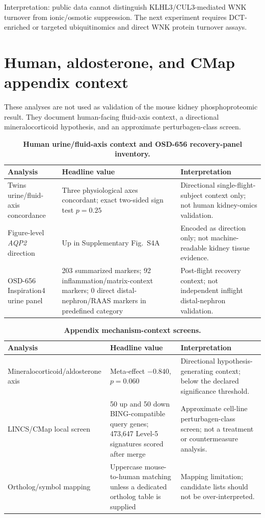 \documentclass[10pt]{article}
\newcommand{\gene}[1]{\textit{#1}}
\newcommand{\code}[1]{\texttt{\detokenize{#1}}}
\begin{document}
\noindent
Interpretation: public data cannot distinguish KLHL3/CUL3-mediated WNK turnover from ionic/osmotic suppression. The next experiment requires DCT-enriched or targeted ubiquitinomics and direct WNK protein turnover assays.

\section{Human, aldosterone, and CMap appendix context}

These analyses are not used as validation of the mouse kidney phosphoproteomic result. They document human-facing fluid-axis context, a directional mineralocorticoid hypothesis, and an approximate perturbagen-class screen.

\begin{table}[H]
\centering\small
\caption{\textbf{Human urine/fluid-axis context and OSD-656 recovery-panel inventory.}}
\label{tab:humancontext}
\begin{tabularx}{\textwidth}{p{}p{}X}
\toprule
Analysis & Headline value & Interpretation \\
\midrule
Twins urine/fluid-axis concordance & Three physiological axes concordant; exact two-sided sign test $p=0.25$ & Directional single-flight-subject context only; not human kidney-omics validation. \\
Figure-level \gene{AQP2} direction & Up in Supplementary Fig.~S4A & Encoded as direction only; not machine-readable kidney tissue evidence. \\
OSD-656 Inspiration4 urine panel & 203 summarized markers; 92 inflammation/matrix-context markers; 0 direct distal-nephron/RAAS markers in predefined category & Post-flight recovery context; not independent inflight distal-nephron validation. \\
\bottomrule
\end{tabularx}
\end{table}

\begin{table}[H]
\centering\small
\caption{\textbf{Appendix mechanism-context screens.}}
\label{tab:appendixmechanisms}
\begin{tabularx}{\textwidth}{p{}p{}X}
\toprule
Analysis & Headline value & Interpretation \\
\midrule
Mineralocorticoid/aldosterone axis & Meta-effect $-0.840$, $p=0.060$ & Directional hypothesis-generating context; below the declared significance threshold. \\
LINCS/CMap local screen & 50 up and 50 down BING-compatible query genes; 473,647 Level-5 signatures scored after \code{sig\_info} merge & Approximate cell-line perturbagen-class screen; not a treatment or countermeasure analysis. \\
Ortholog/symbol mapping & Uppercase mouse-to-human matching unless a dedicated ortholog table is supplied & Mapping limitation; candidate lists should not be over-interpreted. \\
\bottomrule
\end{tabularx}
\end{table}
\end{document}
